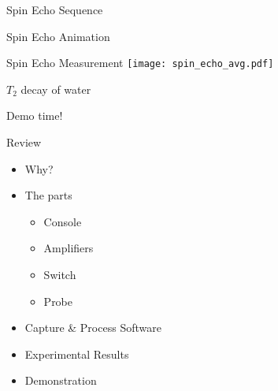 \documentclass{ethpresentation}
\begin{document}
\begin{frame}{Spin Echo Sequence}
    \centering
    
\end{frame}

\begin{frame}{Spin Echo Animation}
    \begin{center}
    \end{center}
\end{frame}

\begin{frame}{Spin Echo Measurement}
    \centering
    \texttt{[image: spin\_echo\_avg.pdf]}
\end{frame}


\begin{frame}{\(T_2\) decay of water}
    \centering
\end{frame}

\begin{frame}[standout]
    Demo time!
\end{frame}

\begin{frame}{Review}
    \begin{itemize}
        \item Why?
        \item The parts%
              \begin{itemize}
                  \item Console
                  \item Amplifiers
                  \item Switch
                  \item Probe
              \end{itemize}
        \item Capture \& Process Software
        \item Experimental Results
        \item Demonstration
    \end{itemize}
\end{frame}
\end{document}
